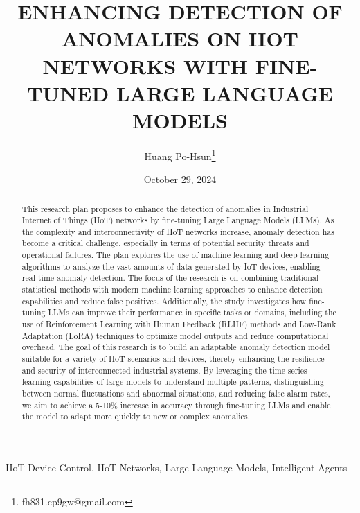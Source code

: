 \documentclass[usenatbib]{tjaa}
\title[Enhancing Detection of Anomalies on IIoT Networks]{ENHANCING DETECTION OF ANOMALIES ON IIOT NETWORKS WITH FINE-TUNED LARGE LANGUAGE MODELS}%
\author[H. Author \others]{%
Huang Po-Hsun\thanks{fh831.cp9gw@gmail.com}
}%
\date{October 29, 2024}
\begin{document}
\label{firstpage}
\pagerange{\pageref{firstpage}--\pageref{lastpage}}

\begin{abstract}
This research plan proposes to enhance the detection of anomalies in Industrial Internet of Things (IIoT) networks
by fine-tuning Large Language Models (LLMs). As the complexity and interconnectivity of IIoT networks increase,
anomaly detection has become a critical challenge, especially in terms of potential security threats
and operational failures. The plan explores the use of machine learning and deep learning algorithms to analyze
the vast amounts of data generated by IoT devices, enabling real-time anomaly detection. The focus of the research
is on combining traditional statistical methods with modern machine learning approaches to enhance detection capabilities
and reduce false positives. Additionally, the study investigates how fine-tuning LLMs can improve their performance in
specific tasks or domains, including the use of Reinforcement Learning with Human Feedback (RLHF) methods and Low-Rank
Adaptation (LoRA) techniques to optimize model outputs and reduce computational overhead. The goal of this research
is to build an adaptable anomaly detection model suitable for a variety of IIoT scenarios and devices,
thereby enhancing the resilience and security of interconnected industrial systems. By leveraging the time series
learning capabilities of large models to understand multiple patterns, distinguishing between normal fluctuations and abnormal situations,
and reducing false alarm rates, we aim to achieve a 5-10\% increase in accuracy through fine-tuning LLMs and enable
the model to adapt more quickly to new or complex anomalies.
\end{abstract}

\begin{keywords}
IIoT Device Control, IIoT Networks, Large Language Models, Intelligent Agents
\end{keywords}




\end{document}
